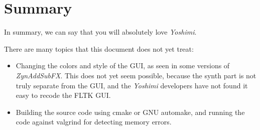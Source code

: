 \documentclass[
 11pt,
 twoside,
 a4paper,
 headinclude,
 footinclude,
 final                                 %
]{article}
\begin{document}



\section{Summary}
\label{sec:summary}

In summary, we can say that you will absolutely love \textsl{Yoshimi}.

There are many topics that this document does  not yet treat:

   \begin{itemize}
      \item Changing the colors and style of the GUI, as seen in some
         versions of \textsl{ZynAddSubFX}.  This does not yet seem possible,
         because the synth part is not truly separate from the GUI, and the
         \textsl{Yoshimi} developers have not found it easy to recode the
         FLTK GUI.
      \item Building the source code using cmake or GNU automake, and
         running the code against valgrind for detecting memory errors.
   \end{itemize}




\printindex
\end{document}
